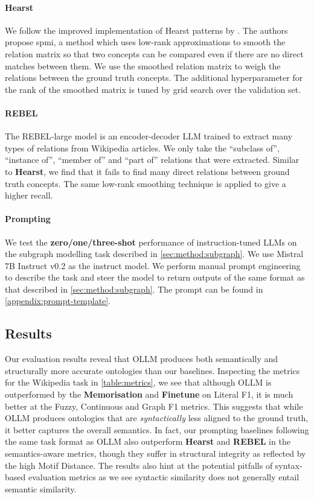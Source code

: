 \documentclass{article}
\newcommand{\name}{{OLLM}\xspace}
\begin{document}
\paragraph{Hearst}
We follow the improved implementation of Hearst patterns by \citet{roller2018hearst}. The authors propose spmi, a method which uses low-rank approximations to smooth the relation matrix so that two concepts can be compared even if there are no direct matches between them. We use the smoothed relation matrix to weigh the relations between the ground truth concepts. The additional hyperparameter for the rank of the smoothed matrix is tuned by grid search over the validation set.

\paragraph{REBEL}
The REBEL-large model \cite{cabot2021rebel} is an encoder-decoder LLM trained to extract many types of relations from Wikipedia articles. We only take the ``subclass of'', ``instance of'', ``member of'' and ``part of'' relations that were extracted. Similar to \textbf{Hearst}, we find that it fails to find many direct relations between ground truth concepts. The same low-rank smoothing technique is applied to give a higher recall.

\paragraph{Prompting}
We test the \textbf{zero/one/three-shot} performance of instruction-tuned LLMs on the subgraph modelling task described in \cref{sec:method:subgraph}. We use Mistral 7B Instruct v0.2 \cite{jiang2023mistral} as the instruct model. We perform manual prompt engineering to describe the task and steer the model to return outputs of the same format as that described in \cref{sec:method:subgraph}. The prompt can be found in \cref{appendix:prompt-template}.

\subsection{Results}



Our evaluation results reveal that \name produces both semantically and structurally more accurate ontologies than our baselines. Inspecting the metrics for the Wikipedia task in \cref{table:metrics}, we see that although \name is outperformed by the \textbf{Memorisation} and \textbf{Finetune} on Literal F1, it is much better at the Fuzzy, Continuous and Graph F1 metrics. This suggests that while \name produces ontologies that are \emph{syntactically} less aligned to the ground truth, it better captures the overall semantics. In fact, our prompting baselines following the same task format as \name also outperform \textbf{Hearst} and \textbf{REBEL} in the semantics-aware metrics, though they suffer in structural integrity as reflected by the high Motif Distance. The results also hint at the potential pitfalls of syntax-based evaluation metrics as we see syntactic similarity does not generally entail semantic similarity.
\end{document}
